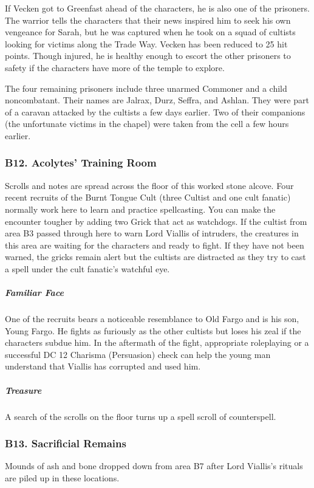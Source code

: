 \documentclass[10pt,a4paper,twoside,bg=print,twocolumn,openany,nodeprecatedcode]{dndbook}
\begin{document}
If Vecken got to Greenfast ahead of the characters, he is also one of the prisoners. The warrior tells the characters that their news inspired him to seek his own vengeance for Sarah, but he was captured when he took on a squad of cultists looking for victims along the Trade Way. Vecken has been reduced to 25 hit points. Though injured, he is healthy enough to escort the other prisoners to safety if the characters have more of the temple to explore.

The four remaining prisoners include three unarmed Commoner and a child noncombatant. Their names are Jalrax, Durz, Seffra, and Ashlan. They were part of a caravan attacked by the cultists a few days earlier. Two of their companions (the unfortunate victims in the chapel) were taken from the cell a few hours earlier.

\subsubsection{B12. Acolytes' Training Room}
Scrolls and notes are spread across the floor of this worked stone alcove. Four recent recruits of the Burnt Tongue Cult (three Cultist and one cult fanatic) normally work here to learn and practice spellcasting. You can make the encounter tougher by adding two Grick that act as watchdogs. If the cultist from area B3 passed through here to warn Lord Viallis of intruders, the creatures in this area are waiting for the characters and ready to fight. If they have not been warned, the gricks remain alert but the cultists are distracted as they try to cast a spell under the cult fanatic's watchful eye.

\subparagraph{Familiar Face}
One of the recruits bears a noticeable resemblance to Old Fargo and is his son, Young Fargo. He fights as furiously as the other cultists but loses his zeal if the characters subdue him. In the aftermath of the fight, appropriate roleplaying or a successful DC 12 Charisma (Persuasion) check can help the young man understand that Viallis has corrupted and used him.

\subparagraph{Treasure}
A search of the scrolls on the floor turns up a spell scroll of counterspell.

\subsubsection{B13. Sacrificial Remains}
Mounds of ash and bone dropped down from area B7 after Lord Viallis's rituals are piled up in these locations.
\end{document}
